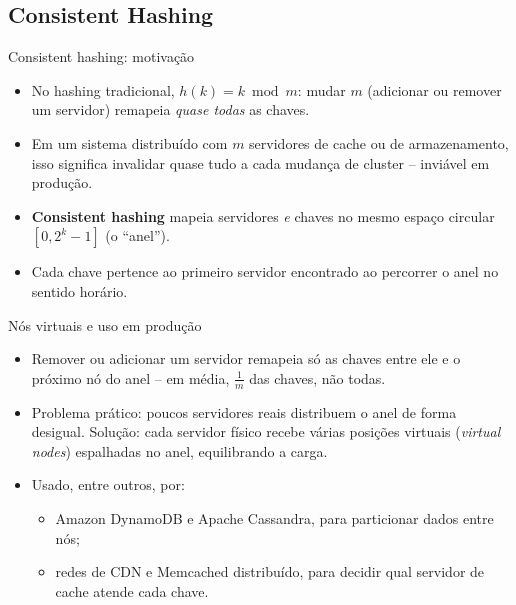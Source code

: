 \documentclass{beamer}
\begin{document}
\subsection{Consistent Hashing}
\begin{frame}{Consistent hashing: motivação}
  \begin{itemize}
    \item No hashing tradicional, $h(k) = k \bmod m$: mudar $m$ (adicionar ou remover um servidor) remapeia \emph{quase todas} as chaves.
    \item Em um sistema distribuído com $m$ servidores de cache ou de armazenamento, isso significa invalidar quase tudo a cada mudança de cluster -- inviável em produção.
    \item \textbf{Consistent hashing} mapeia servidores \emph{e} chaves no mesmo espaço circular $[0, 2^{k}-1]$ (o ``anel'').
    \item Cada chave pertence ao primeiro servidor encontrado ao percorrer o anel no sentido horário.
  \end{itemize}
  \centering\small
\end{frame}

\begin{frame}{Nós virtuais e uso em produção}
  \begin{itemize}
    \item Remover ou adicionar um servidor remapeia só as chaves entre ele e o próximo nó do anel -- em média, $\frac{1}{m}$ das chaves, não todas.
    \item Problema prático: poucos servidores reais distribuem o anel de forma desigual. Solução: cada servidor físico recebe várias posições virtuais (\emph{virtual nodes}) espalhadas no anel, equilibrando a carga.
    \item Usado, entre outros, por:
    \begin{itemize}
      \item Amazon DynamoDB e Apache Cassandra, para particionar dados entre nós;
      \item redes de CDN e Memcached distribuído, para decidir qual servidor de cache atende cada chave.
    \end{itemize}
  \end{itemize}
\end{frame}
\end{document}
